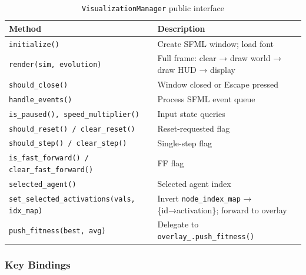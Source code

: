 \begin{table}[H]
\centering\small
\caption{\texttt{VisualizationManager} public interface}
\begin{tabularx}{\textwidth}{@{}lX@{}}
\toprule
\textbf{Method} & \textbf{Description} \\
\midrule
\texttt{initialize()} & Create SFML window; load font \\
\texttt{render(sim, evolution)} & Full frame: clear → draw world → draw HUD → display \\
\texttt{should\_close()} & Window closed or Escape pressed \\
\texttt{handle\_events()} & Process SFML event queue \\
\texttt{is\_paused(), speed\_multiplier()} & Input state queries \\
\texttt{should\_reset() / clear\_reset()} & Reset-requested flag \\
\texttt{should\_step() / clear\_step()} & Single-step flag \\
\texttt{is\_fast\_forward() / clear\_fast\_forward()} & FF flag \\
\texttt{selected\_agent()} & Selected agent index \\
\texttt{set\_selected\_activations(vals, idx\_map)} & Invert \texttt{node\_index\_map} → \{id→activation\}; forward to overlay \\
\texttt{push\_fitness(best, avg)} & Delegate to \texttt{overlay\_.push\_fitness()} \\
\bottomrule
\end{tabularx}
\end{table}

\subsubsection{Key Bindings}

